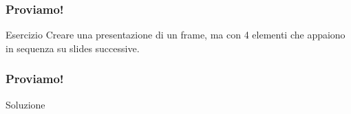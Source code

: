 \begin{frame}[fragile]
  \frametitle{Proviamo!}
  
 \begin{esercizio}{Esercizio}
    Creare una presentazione di un frame, ma con 4 elementi che appaiono in sequenza su slides successive.
 \end{esercizio}

\begin{frame}[fragile]
  \frametitle{Proviamo!}
  
 \begin{soluzione}{Soluzione}
    
 \end{soluzione}

\end{frame}

\end{frame}
 
